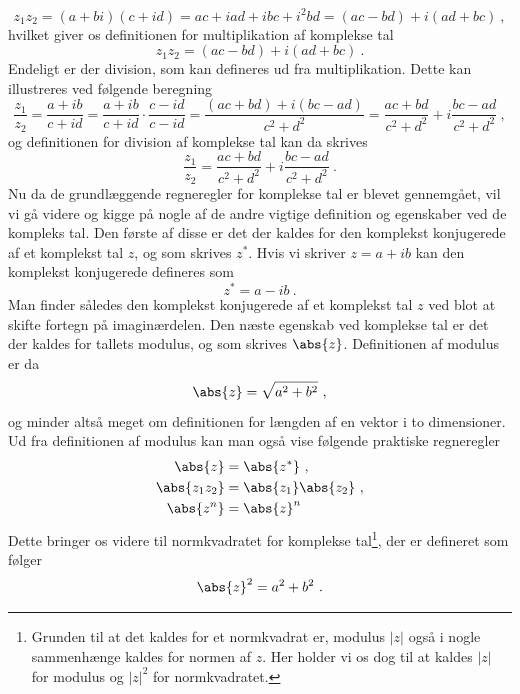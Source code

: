 $$z_1 z_2 = (a+bi)(c+id) = ac + iad + ibc + i^2bd = (ac-bd) + i(ad+bc) \ ,$$
hvilket giver os definitionen for multiplikation af komplekse tal
\begin{equation}
\label{kompleks_mul}
z_1z_2 = (ac-bd) +i(ad+bc) \ .
\end{equation}
Endeligt er der division, som kan defineres ud fra multiplikation. Dette kan illustreres ved følgende beregning
$$\frac{z_1}{z_2} = \frac{a+ib}{c+id} = \frac{a+ib}{c+id} \cdot \frac{c-id}{c-id} = \frac{(ac+bd) + i(bc-ad)}{c^2 + d^2} = \frac{ac+bd}{c^2 + d^2} + i \frac{bc-ad}{c^2 + d^2} \ ,$$
og definitionen for division af komplekse tal kan da skrives
\begin{equation}
\label{kompleks_div}
\frac{z_1}{z_2} = \frac{ac+bd}{c^2+d^2} + i\frac{bc-ad}{c^2+d^2} \ .
\end{equation}
Nu da de grundlæggende regneregler for komplekse tal er blevet gennemgået, vil vi gå videre og kigge på nogle af de andre vigtige definition og egenskaber ved de kompleks tal. Den første af disse er det der kaldes for den komplekst konjugerede af et komplekst tal $z$, og som skrives $z^*$. Hvis vi skriver $z = a+ib$ kan den komplekst konjugerede defineres som
\begin{equation}
z^* = a - ib \ .
\end{equation}
Man finder således den komplekst konjugerede af et komplekst tal $z$ ved blot at skifte fortegn på imaginærdelen. Den næste egenskab ved komplekse tal er det der kaldes for tallets modulus, og som skrives $\abs{z}$. Definitionen af modulus er da
\begin{equation}
\abs{z} = \sqrt{a^2 + b^2} \ ,
\end{equation}
og minder altså meget om definitionen for længden af en vektor i to dimensioner. Ud fra definitionen af modulus kan man også vise følgende praktiske regneregler
\begin{align}
\abs{z} &= \abs{z^*} \ , \\
\abs{z_1 z_2} &= \abs{z_1} \abs{z_2} \ , \\
\abs{z^n} &= \abs{z}^n
\end{align}
Dette bringer os videre til normkvadratet for komplekse tal\footnote{Grunden til at det kaldes for et normkvadrat er, modulus $|z|$ også i nogle sammenhænge kaldes for normen af $z$. Her holder vi os dog til at kaldes $|z|$ for modulus og $|z|^2$ for normkvadratet.}, der er defineret som følger
\begin{equation}
\abs{z}^2 = a^2 + b^2 \ .
\end{equation}
